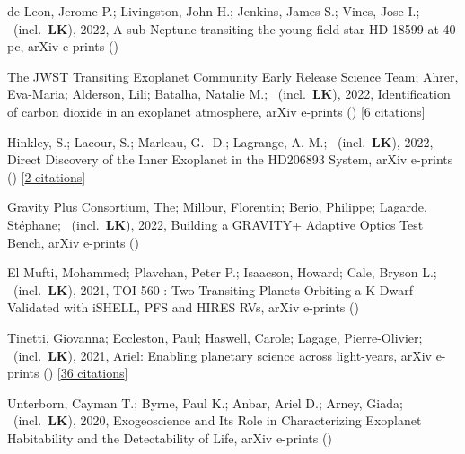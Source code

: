 \item[{\color{numcolor}\scriptsize18}] de Leon, Jerome P.; Livingston, John H.; Jenkins, James S.; Vines, Jose I.; \etal\ (incl.\ \textbf{LK}), 2022, A sub-Neptune transiting the young field star HD 18599 at 40 pc, arXiv e-prints ()

\item[{\color{numcolor}\scriptsize17}] The JWST Transiting Exoplanet Community Early Release Science Team; Ahrer, Eva-Maria; Alderson, Lili; Batalha, Natalie M.; \etal\ (incl.\ \textbf{LK}), 2022, Identification of carbon dioxide in an exoplanet atmosphere, arXiv e-prints () [\href{https://ui.adsabs.harvard.edu/abs/2022arXiv220811692T}{6 citations}]

\item[{\color{numcolor}\scriptsize16}] Hinkley, S.; Lacour, S.; Marleau, G. -D.; Lagrange, A. M.; \etal\ (incl.\ \textbf{LK}), 2022, Direct Discovery of the Inner Exoplanet in the HD206893 System, arXiv e-prints () [\href{https://ui.adsabs.harvard.edu/abs/2022arXiv220804867H}{2 citations}]

\item[{\color{numcolor}\scriptsize15}] Gravity Plus Consortium, The; Millour, Florentin; Berio, Philippe; Lagarde, St{\'e}phane; \etal\ (incl.\ \textbf{LK}), 2022, Building a GRAVITY+ Adaptive Optics Test Bench, arXiv e-prints ()

\item[{\color{numcolor}\scriptsize14}] El Mufti, Mohammed; Plavchan, Peter P.; Isaacson, Howard; Cale, Bryson L.; \etal\ (incl.\ \textbf{LK}), 2021, TOI 560 : Two Transiting Planets Orbiting a K Dwarf Validated with iSHELL, PFS and HIRES RVs, arXiv e-prints ()

\item[{\color{numcolor}\scriptsize13}] Tinetti, Giovanna; Eccleston, Paul; Haswell, Carole; Lagage, Pierre-Olivier; \etal\ (incl.\ \textbf{LK}), 2021, Ariel: Enabling planetary science across light-years, arXiv e-prints () [\href{https://ui.adsabs.harvard.edu/abs/2021arXiv210404824T}{36 citations}]

\item[{\color{numcolor}\scriptsize12}] Unterborn, Cayman T.; Byrne, Paul K.; Anbar, Ariel D.; Arney, Giada; \etal\ (incl.\ \textbf{LK}), 2020, Exogeoscience and Its Role in Characterizing Exoplanet Habitability and the Detectability of Life, arXiv e-prints ()

